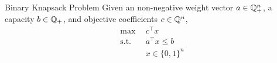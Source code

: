 
\begin{general}{Binary Knapsack Problem}{\npcomplete}
Given an non-negative weight vector $a \in {\mathbb{Q}}^n_+$, a capacity $b \in {\mathbb{Q}}_+$, and objective coefficients $c \in {\mathbb{Q}}^n$, 
\begin{equation}
\begin{split}
\max \ \ & c^\top x\\
\text{s.t.}\ \ & a^\top x \leq b\\
& x \in \{0,1\}^n
\end{split}
\end{equation}
\end{general}
 


 

